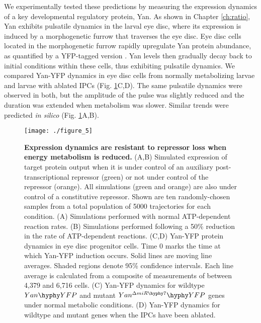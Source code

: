 We experimentally tested these predictions by measuring the expression dynamics of a key developmental regulatory protein, Yan. As shown in Chapter \ref{ch:ratio}, Yan exhibits pulsatile dynamics in the larval eye disc, where its expression is induced by a morphogenetic furrow that traverses the eye disc. Eye disc cells located in the morphogenetic furrow rapidly upregulate Yan protein abundance, as quantified by a YFP-tagged version \cite{Pelaez2015a}. Yan levels then gradually decay back to initial conditions within these cells, thus exhibiting pulsatile dynamics. We compared Yan-YFP dynamics in eye disc cells from normally metabolizing larvae and larvae with ablated IPCs (Fig. \ref{fig:metabolism:fig5}C,D). The same pulsatile dynamics were observed in both, but the amplitude of the pulse was slightly reduced and the duration was extended when metabolism was slower. Similar trends were predicted \textit{in silico} (Fig. \ref{fig:metabolism:fig5}A,B).

\begin{figure}[h!]
\centering
\texttt{[image: ./figure\_5]}
\caption[Expression dynamics are less affected when metabolism is reduced.]{\textbf{Expression dynamics are resistant to repressor loss when energy metabolism is reduced.} (A,B) Simulated expression of target protein output when it is under control of an auxiliary post-transcriptional repressor (green) or not under control of the repressor (orange). All simulations (green and orange) are also under control of a constitutive repressor. Shown are ten randomly-chosen samples from a total population of 5000 trajectories for each condition. (A) Simulations performed with normal ATP-dependent reaction rates. (B) Simulations performed following a 50\% reduction in the rate of ATP-dependent reactions. (C,D) Yan-YFP protein dynamics in eye disc progenitor cells. Time 0 marks the time at which Yan-YFP induction occurs. Solid lines are moving line averages. Shaded regions denote 95\% confidence intervals. Each line average is calculated from a composite of measurements of between 4,379 and 6,716 cells. (C) Yan-YFP dynamics for wildtype $Yan\hyphy YFP$ and mutant $Yan^{\Delta miR\hyphy  7}\hyphy YFP$ genes under normal metabolic conditions. (D) Yan-YFP dynamics for wildtype and mutant genes when the IPCs have been ablated.}
\label{fig:metabolism:fig5}
\end{figure}

